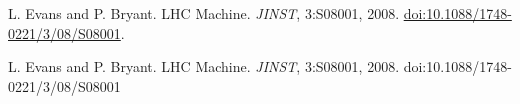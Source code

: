 \begin{thebibliography}{99}
\setlength{\itemsep}{0.3in}

L. Evans and P. Bryant. LHC Machine. \textit{JINST}, 3:S08001, 2008. \href{http://iopscience.iop.org/1748-0221/3/08/S08001/}{doi:10.1088/1748-0221/3/08/S08001}.

L. Evans and P. Bryant. LHC Machine. \textit{JINST}, 3:S08001, 2008. doi:10.1088/1748-0221/3/08/S08001



\end{thebibliography}
